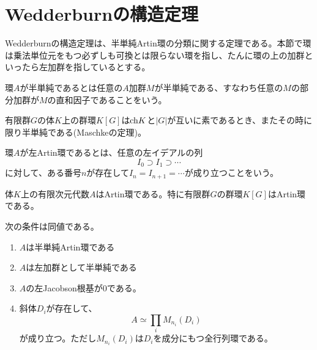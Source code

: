 \documentclass{ltjsreport}
\begin{document}
\chapter{Wedderburnの構造定理}

Wedderburnの構造定理は、半単純Artin環の分類に関する定理である。本節で環は乗法単位元をもつ必ずしも可換とは限らない環を指し、たんに環の上の加群といったら左加群を指しているとする。

\begin{defin}
  環$A$が半単純であるとは任意の$A$加群$M$が半単純である、すなわち任意の$M$の部分加群が$M$の直和因子であることをいう。
\end{defin}

\begin{eg}
  有限群$G$の体$K$上の群環$K[G]$は$\text{ch} K$と$|G|$が互いに素であるとき、またその時に限り半単純である(Maschkeの定理)。
\end{eg}

\begin{defin}
  環$A$が左Artin環であるとは、任意の左イデアルの列
  \[
  I_0\supset I_1\supset \cdots  
  \]
  に対して、ある番号$n$が存在して$I_n=I_{n+1}=\cdots$が成り立つことをいう。
\end{defin}

\begin{eg}
  体$K$上の有限次元代数$A$はArtin環である。特に有限群$G$の群環$K[G]$はArtin環である。
\end{eg}

\begin{theo}[Wedderburnの構造定理]
  次の条件は同値である。
  \begin{enumerate}
    \item $A$は半単純Artin環である
    \item $A$は左加群として半単純である
    \item $A$の左Jacobson根基が0である。
    \item 斜体$D_i$が存在して、
    \[
    A\simeq \prod_iM_{n_i}(D_i)  
    \]
    が成り立つ。ただし$M_{n_i}(D_i)$は$D_i$を成分にもつ全行列環である。
  \end{enumerate}
\end{theo}
\end{document}
